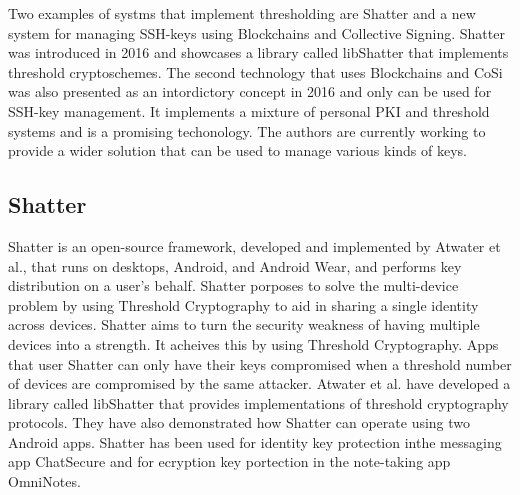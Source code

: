 Two examples of systms that implement thresholding are Shatter\cite{Atwater2016} and a new system for managing SSH-keys using Blockchains and Collective Signing\cite{Kokoris-kogias}. Shatter was introduced in 2016 and showcases a library called libShatter that implements threshold cryptoschemes. The second technology that uses Blockchains and CoSi was also presented as an intordictory concept in 2016 and only can be used for SSH-key management. It implements a mixture of personal PKI and threshold systems and is a promising techonology. The authors are currently working to provide a wider solution that can be used to manage various kinds of keys.

\subsection{Shatter}

Shatter is an open-source framework, developed and implemented by Atwater et al.\cite{Atwater2016}, that runs on desktops, Android, and Android Wear, and performs key distribution on a user's behalf. Shatter porposes to solve the multi-device problem by using Threshold Cryptography to aid in sharing a single identity across devices. Shatter aims to turn the security weakness of having multiple devices into a strength. It acheives this by using Threshold Cryptography\cite{Desmedt1994, Desmedt2001}. Apps that user Shatter can only have their keys compromised when a threshold number of devices are compromised by the same attacker. Atwater et al.\cite{Atwater2016} have developed a library called libShatter that provides implementations of threshold cryptography protocols. They have also demonstrated how Shatter can operate using two Android apps. Shatter has been used for identity key protection inthe messaging app ChatSecure and for ecryption key portection in the note-taking app OmniNotes.


